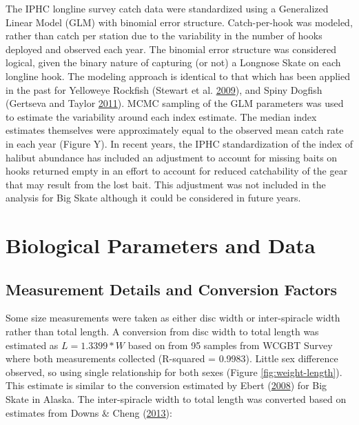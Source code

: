 \documentclass[12pt,]{article}
\begin{document}
The IPHC longline survey catch data were standardized using a
Generalized Linear Model (GLM) with binomial error structure.
Catch-per-hook was modeled, rather than catch per station due to the
variability in the number of hooks deployed and observed each year. The
binomial error structure was considered logical, given the binary nature
of capturing (or not) a Longnose Skate on each longline hook. The
modeling approach is identical to that which has been applied in the
past for Yelloweye Rockfish (Stewart et al.
\protect\hyperlink{ref-Stewart2009}{2009}), and Spiny Dogfish (Gertseva
and Taylor \protect\hyperlink{ref-Gertseva2011}{2011}). MCMC sampling of
the GLM parameters was used to estimate the variability around each
index estimate. The median index estimates themselves were approximately
equal to the observed mean catch rate in each year (Figure Y). In recent
years, the IPHC standardization of the index of halibut abundance has
included an adjustment to account for missing baits on hooks returned
empty in an effort to account for reduced catchability of the gear that
may result from the lost bait. This adjustment was not included in the
analysis for Big Skate although it could be considered in future years.
\newpage

\hypertarget{biological-parameters-and-data}{%
\section{Biological Parameters and
Data}\label{biological-parameters-and-data}}

\hypertarget{measurement-details-and-conversion-factors}{%
\subsection{Measurement Details and Conversion
Factors}\label{measurement-details-and-conversion-factors}}

Some size measurements were taken as either disc width or inter-spiracle
width rather than total length. A conversion from disc width to total
length was estimated as \(L = 1.3399 * W\) based on from 95 samples from
WCGBT Survey where both measurements collected (R-squared = 0.9983).
Little sex difference observed, so using single relationship for both
sexes (Figure \ref{fig:weight-length}). This estimate is similar to the
conversion estimated by Ebert (\protect\hyperlink{ref-Ebert2008}{2008})
for Big Skate in Alaska. The inter-spiracle width to total length was
converted based on estimates from Downs \& Cheng
(\protect\hyperlink{ref-Downs2013}{2013}):
\end{document}
